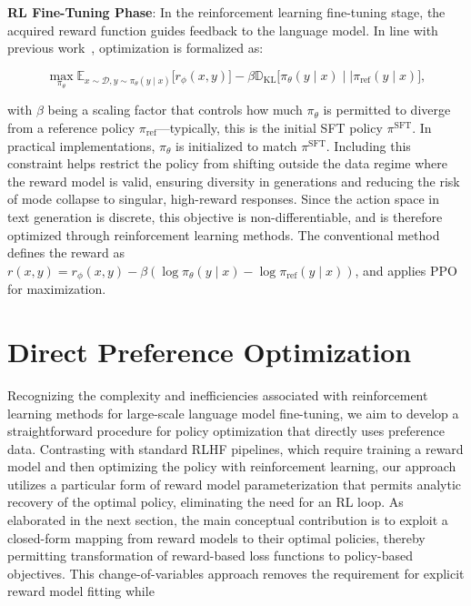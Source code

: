 \textbf{RL Fine-Tuning Phase}: In the reinforcement learning fine-tuning stage, the acquired reward function guides feedback to the language model. In line with previous work~\citep{jaques2017sequence, jaques2020human}, optimization is formalized as:

\begin{equation}\label{eq:RL}
\max_{\pi_{\theta}}  \mathbb{E}_{x\sim \mathcal{D}, y\sim \pi_{\theta}(y \mid x)}\bigl[r_{\phi}(x, y)\bigr] - \beta\mathbb{D}_{\textrm{KL}}\bigl[\pi_{\theta}(y\mid x)\mid \mid \pi_\text{ref}(y\mid x)\bigr],
\end{equation}

with $\beta$ being a scaling factor that controls how much $\pi_\theta$ is permitted to diverge from a reference policy $\pi_\text{ref}$—typically, this is the initial SFT policy $\pi^\text{SFT}$. In practical implementations, $\pi_\theta$ is initialized to match $\pi^\text{SFT}$. Including this constraint helps restrict the policy from shifting outside the data regime where the reward model is valid, ensuring diversity in generations and reducing the risk of mode collapse to singular, high-reward responses. Since the action space in text generation is discrete, this objective is non-differentiable, and is therefore optimized through reinforcement learning methods. The conventional method \citep{ziegler2020finetuning, stiennon2022learning, bai2022training, ouyang2022training} defines the reward as ${r(x, y) = r_{\phi}(x, y) -\beta (\log \pi_{\theta}(y\mid x) - \log \pi_\text{ref}(y\mid x))}$, and applies PPO~\cite{schulman2017proximal} for maximization.

\section{Direct Preference Optimization}\label{sec:DPO}

Recognizing the complexity and inefficiencies associated with reinforcement learning methods for large-scale language model fine-tuning, we aim to develop a straightforward procedure for policy optimization that directly uses preference data. Contrasting with standard RLHF pipelines, which require training a reward model and then optimizing the policy with reinforcement learning, our approach utilizes a particular form of reward model parameterization that permits analytic recovery of the optimal policy, eliminating the need for an RL loop. As elaborated in the next section, the main conceptual contribution is to exploit a closed-form mapping from reward models to their optimal policies, thereby permitting transformation of reward-based loss functions to policy-based objectives. This change-of-variables approach removes the requirement for explicit reward model fitting while

